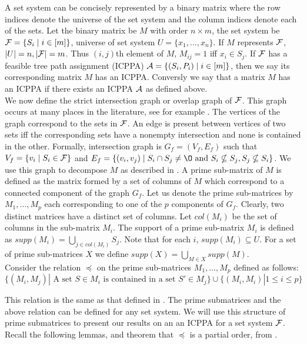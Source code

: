\documentclass[MS]             %
              {iitmdiss_as}    %
\begin{document}
\noindent
A set system can be concisely represented by a binary matrix where the
row indices denote the universe of the set system and the column
indices denote each of the sets. Let the binary matrix be $M$ with
order $n \times m$, the set system be ${\cal F} = \{S_i \mid i \in [m]\}$,
universe of set system $U = \{x_1, \dots ,x_n\}$. If $M$ represents
${\cal F}$, $|U| = n, |{\cal F}| = m$. Thus $(i,j)$th element of $M$, $M_{ij} =
1$ iff $x_i \in S_j$. If ${\cal F}$ has a feasible tree path assignment
(ICPPA) ${\cal A} = \{(S_i,P_i) \mid i \in [m]\}$, then we say its
corresponding matrix $M$ has an ICPPA. Conversly we say that a matrix
$M$ has an ICPPA if there exists an ICPPA ${\cal A}$ as defined
above.\\
\noindent
We now define the strict intersection graph or overlap graph of
${\cal F}$. This graph occurs at many places in the literature, see for
example \cite{kklv10, wlh02, nsnrs09}.  The vertices of the graph
correspond to the sets in ${\cal F}$.  An edge is present between vertices
of two sets iff the corresponding sets have a nonempty intersection
and none is contained in the other. Formally, intersection graph is
$G_f = (V_f, E_f)$ such that $V_f = \{v_i \mid S_i \in {\cal F}\}$ and $E_f
= \{(v_i, v_j) \mid S_i \cap S_j \ne \O \text{ and }S_i \nsubseteq
S_j, S_j \nsubseteq S_i \}$.  We use this graph to decompose $M$ as
described in \cite{wlh02,nsnrs09}.  A prime sub-matrix of $M$ is
defined as the matrix formed by a set of columns of $M$ which
correspond to a connected component of the graph $G_f$.  Let us denote
the prime sub-matrices by $M_1,\ldots,M_p$ each corresponding to one
of the $p$ components of $G_f$. Clearly, two distinct matrices have a
distinct set of columns.  Let $col(M_i)$ be the set of columns in the
sub-matrix $M_i$.  The support of a prime sub-matrix $M_i$ is defined
as $supp(M_i) = \displaystyle \bigcup_{j \in col(M_i)}S_j$.  Note that
for each $i$, $supp(M_i) \subseteq U$.  For a set of prime
sub-matrices $X$ we define
$supp(X) = \displaystyle \bigcup_{M \in X} supp(M)$. \\


\noindent
Consider the relation $\preccurlyeq$ on the prime sub-matrices $M_1,
\ldots, M_p$ defined as follows:
\begin{equation}
  \nonumber \{(M_i,M_j) | \mbox{ A set } S \in
  M_i \mbox{ is contained in a set } S' \in M_j\} \cup \{(M_i,M_i) | 1
  \leq i \leq p\} 
\end{equation}

\noindent
This relation is the same as that defined in \cite{nsnrs09}. The prime
submatrices and the above relation can be defined for any set
system. We will use this structure of prime submatrices to present our
results on an an ICPPA for a set system ${\cal F}$. Recall the following
lemmas, and theorem that $\preccurlyeq$ is a partial order, from
\cite{nsnrs09}.
\end{document}
